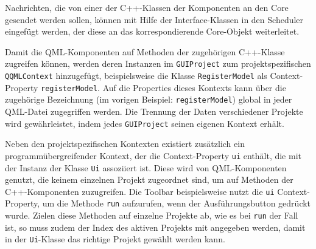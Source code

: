 Nachrichten, die von einer der C++-Klassen der Komponenten an den Core gesendet
werden sollen, können mit Hilfe der Interface-Klassen in den Scheduler eingefügt
werden, der diese an das korrespondierende Core-Objekt weiterleitet.

Damit die QML-Komponenten auf Methoden der zugehörigen C++-Klasse zugreifen
können, werden deren Instanzen im \texttt{GUIProject} zum projektspezifischen
\texttt{QQMLContext} hinzugefügt, beispielsweise die Klasse
\texttt{RegisterModel} als Context-Property \texttt{registerModel}. Auf die
Properties dieses Kontexts kann über die zugehörige Bezeichnung (im vorigen Beispiel:
\texttt{registerModel}) global in jeder QML-Datei zugegriffen werden. Die
Trennung der Daten verschiedener Projekte wird gewährleistet, indem jedes
\texttt{GUIProject} seinen eigenen Kontext erhält.

Neben den projektspezifischen Kontexten existiert zusätzlich ein
programmübergreifender Kontext, der die Context-Property \texttt{ui} enthält,
die mit der Instanz der Klasse \texttt{Ui} assoziiert ist. Diese wird von
QML-Komponenten genutzt, die keinem einzelnen Projekt zugeordnet sind, um auf
Methoden der C++-Komponenten zuzugreifen. Die Toolbar beispielsweise nutzt die
\texttt{ui} Context-Property, um die Methode \texttt{run} aufzurufen, wenn der
Ausführungsbutton gedrückt wurde. Zielen diese Methoden auf einzelne Projekte
ab, wie es bei \texttt{run} der Fall ist, so muss zudem der Index des aktiven Projekts
mit angegeben werden, damit in der \texttt{Ui}-Klasse das richtige Projekt
gewählt werden kann.
